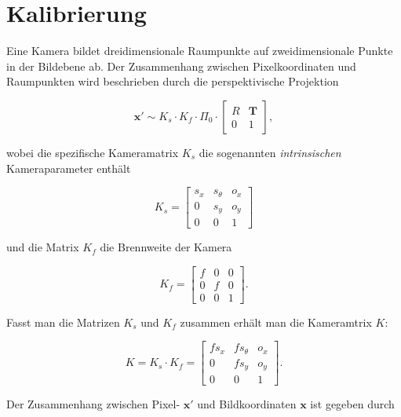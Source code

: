 \section{Kalibrierung}
\label{sec:kalibrierung}

Eine Kamera bildet dreidimensionale Raumpunkte auf zweidimensionale Punkte in der Bildebene ab. Der Zusammenhang zwischen Pixelkoordinaten und Raumpunkten wird beschrieben durch die perspektivische Projektion

\begin{equation}
  \label{eq:pixelkorrdinaten_projektion}
\mathbf{x'} \sim K_s \cdot K_f \cdot \Pi_0 \cdot \begin{bmatrix} R & \mathbf{T} \\ 0 & 1 \end{bmatrix}, 
\end{equation}

wobei die spezifische Kameramatrix $K_s$ die sogenannten \textit{intrinsischen} Kameraparameter enthält

\begin{equation}
  \label{eq:specific_camera_matrix}
K_s = \begin{bmatrix} s_x & s_\theta & o_x \\ 0 & s_y & o_y \\ 0 & 0 & 1  \end{bmatrix}
\end{equation}

und die Matrix $K_f$ die Brennweite der Kamera

\begin{equation}
  \label{eq:focal_length}
K_f = \begin{bmatrix} f & 0 & 0 \\ 0 & f & 0 \\ 0 & 0 & 1  \end{bmatrix}.
\end{equation}

Fasst man die Matrizen $K_s$ und $K_f$ zusammen erhält man die Kameramtrix $K$:

\begin{equation}
  \label{eq:camera_matrix}
K = K_s \cdot K_f =  \begin{bmatrix} f s_x & f s_\theta & o_x \\ 0 & f s_y & o_y \\ 0 & 0 & 1  \end{bmatrix}.
\end{equation}

Der Zusammenhang zwischen Pixel- $\mathbf{x'}$ und Bildkoordinaten $\mathbf{x}$ ist gegeben durch

